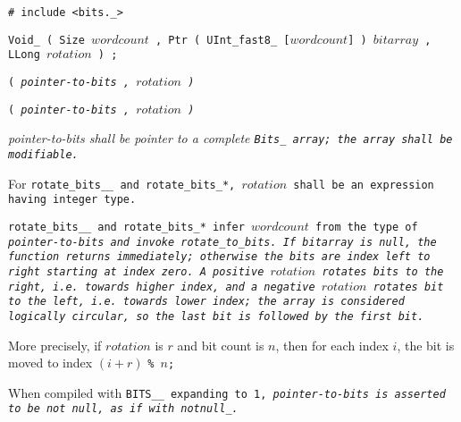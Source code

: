 
\tt{# include <bits._>}

\tt{Void_}  \tt{( Size} $wordcount$
\tt{, Ptr ( UInt_fast8_ [}$wordcount$\tt{] )} $bitarray$
\tt{, LLong} $rotation$ \tt{) ;}

\s\tt{(}
\it{pointer-to-bits} \tt{,} $rotation$ \tt{)}

\s\s\tt{(}
\it{pointer-to-bits} \tt{,} $rotation$ \tt{)}


\it{pointer-to-bits} shall be pointer to a complete
\tt{Bits_} array; the array shall be modifiable.

For \tt{rotate_bits__} and \tt{rotate_bits_}*,
$rotation$ shall be an expression having integer type.


\tt{rotate_bits__} and \tt{rotate_bits_}* infer $wordcount$ from
the type of \it{pointer-to-bits} and invoke \tt{rotate_to_bits}.
If \it{bitarray} is null, the function returns immediately;
otherwise the bits are index left to right starting at index zero.
A positive $rotation$ rotates bits to the right, i.e. towards higher index, and a
negative $rotation$ rotates bit to the left, i.e. towards lower index; the array
is considered logically circular, so the last bit is followed by the first bit.

More precisely, if $rotation$ is $r$ and bit count is $n$,
then for each index $i$, the bit is moved to index $(i + r)$ \tt{\%} $n$;

When compiled with \tt{BITS__} expanding to \tt{1},
\it{pointer-to-bits} is asserted to be not null, as if with \tt{notnull_}.
